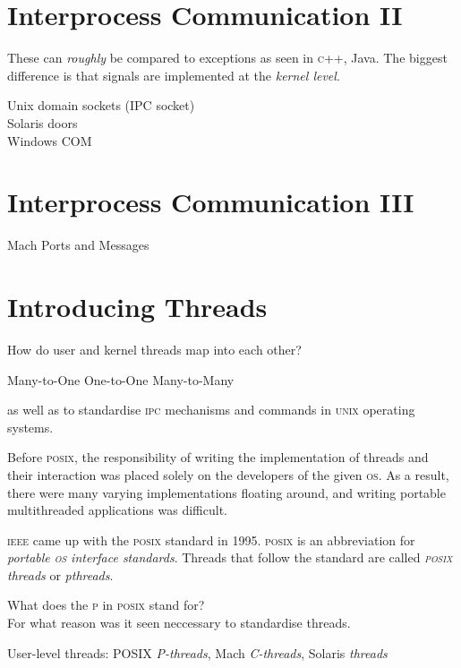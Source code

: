 \section{Interprocess Communication II}



These can \textit{roughly} be compared to exceptions as seen in \textsc{c}++, Java.
The biggest difference is that signals are implemented at the \textit{kernel level}. 


Unix domain sockets (IPC socket) \\
Solaris doors \\
Windows COM \\


\section{Interprocess Communication III}

Mach Ports and Messages 



\section{Introducing Threads}








How do user and kernel threads map into each other?

Many-to-One
One-to-One
Many-to-Many



as well as to standardise \textsc{ipc} mechanisms and commands 
in \textsc{unix} operating systems.

Before \textsc{posix}, the responsibility of writing the
implementation of threads and their interaction was placed 
solely on the developers of the given \textsc{os}. 
As a result, there were many varying implementations floating around, 
and writing portable multithreaded applications was difficult.

\textsc{ieee} came up with the \textsc{posix} standard in 1995. 
\textsc{posix} is an abbreviation for 
\textit{portable \textsc{os} interface standards}.
Threads that follow the standard are called 
\textit{\textsc{posix} threads} or \textit{pthreads}.

\begin{example}
What does the \textsc{p} in \textsc{posix} stand for? \\
For what reason was it seen neccessary to standardise threads.
\end{example}


User-level threads: 
POSIX \textit{P-threads}, Mach \textit{C-threads}, Solaris \textit{threads}



